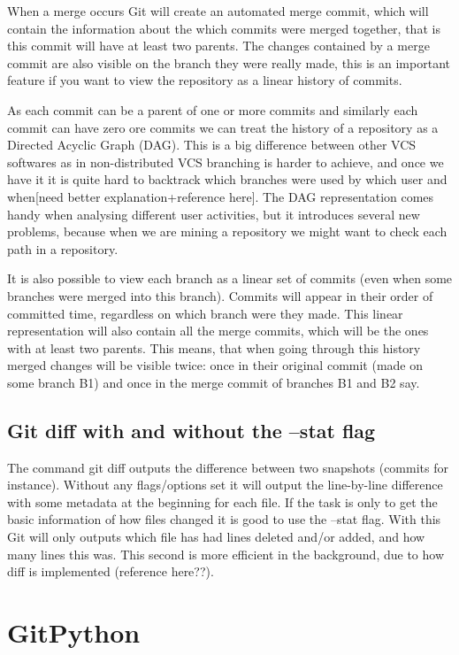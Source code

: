 \documentclass[12pt,twoside,notitlepage]{report}
\begin{document}
When a merge occurs Git will create an automated merge commit, which will contain the information about the which commits were merged together, that is this commit will have at least two parents. The changes contained by a merge commit are also visible on the branch they were really made, this is an important feature if you want to view the repository as a linear history of commits. 

As each commit can be a parent of one or more commits and similarly each commit can have zero ore commits we can treat the history of a repository as a Directed Acyclic Graph (DAG). This is a big difference between other VCS softwares as in non-distributed VCS branching is harder to achieve, and once we have it it is quite hard to backtrack which branches were used by which user and when[need better explanation+reference here]. The DAG representation comes handy when analysing different user activities, but it introduces several new problems, because when we are mining a repository we might want to check each path in a repository. 

It is also possible to view each branch as a linear set of commits (even when some branches were merged into this branch). Commits will appear in their order of committed time, regardless on which branch were they made. This linear representation will also contain all the merge commits, which will be the ones with at least two parents. This means, that when going through this history merged changes will be visible twice: once in their original commit (made on some branch B1) and once in the merge commit of branches B1 and B2 say.	
\subsection{Git diff with and without the --stat flag}
The command git diff outputs the difference between two snapshots (commits for instance). Without any flags/options set it will output the line-by-line difference with some metadata at the beginning for each file. If the task is only to get the basic information of how files changed it is good to use the --stat flag. With this Git will only outputs which file has had lines deleted and/or added, and how many lines this was. This second is more efficient in the background, due to how diff is implemented (reference here??).
\section{GitPython}
\end{document}
